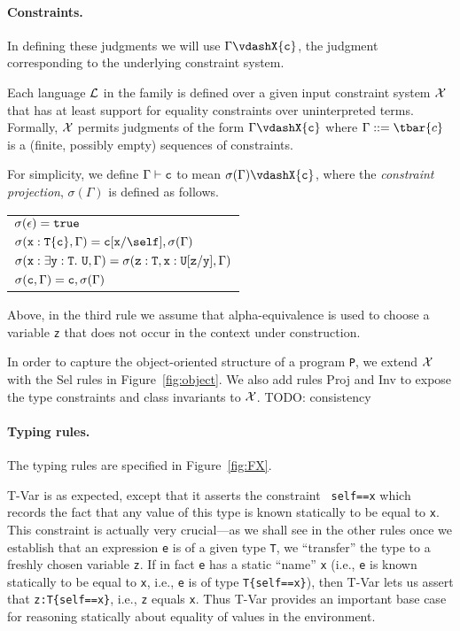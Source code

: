 \paragraph{Constraints.}
In defining these judgments we will use \mbox{$\Gamma \vdashX {\tt c}$},
the judgment corresponding to the underlying constraint system.

Each language $\cal L$ in the family is defined over a given input
constraint system $\cal X$ that has at least support for equality constraints over uninterpreted terms.
Formally, $\cal X$ permits judgments of the form
$\Gamma \vdashX {\tt c}$ where $\Gamma::=\tbar{c}$ is a (finite, possibly empty) sequences of constraints.

For
simplicity, we define $\Gamma \vdash {\tt c}$ to mean
$\sigma(\Gamma)\vdashX {\tt c}$, where the {\em constraint
projection}, $\sigma(\Gamma)$ is defined as follows. 
%
\begin{center}
\begin{tabular}{l}
$\sigma(\epsilon)={\tt true}$\\
$\sigma({\tt x}:{\tt T\{c\}}, \Gamma)={\tt c}[{\tt x}/\self], \sigma(\Gamma)$\\
$\sigma({\tt x}:\exists {\tt y}:{\tt T}.~{\tt U}, \Gamma)=\sigma({\tt z:T}, {\tt x}:{\tt U[{\tt z}/{\tt y}]},\Gamma)$\\
$\sigma({\tt c},\Gamma) = {\tt c}, \sigma(\Gamma)$
\end{tabular}
\end{center}
%
Above, in the third rule we assume that alpha-equivalence is used to
choose a variable {\tt z} that does not
occur in the context under construction.

In order to capture the object-oriented structure of a program {\tt P}, we extend $\cal X$ with the {\sc Sel} rules in Figure~\ref{fig:object}. We also add rules {\sc Proj} and {\sc Inv} to expose the type constraints and class invariants to $\cal X$. TODO: consistency

\paragraph{Typing rules.} The typing rules are specified in Figure~\ref{fig:FX}.

{\sc T-Var} is as expected, except that it asserts the constraint {\tt
self==x} which records the fact that any value of this type is known
statically to be equal to {\tt x}. This constraint is actually very
crucial---as we shall see in the other rules once we establish that
an expression {\tt e} is of a given type {\tt T}, we ``transfer'' the
type to a freshly chosen variable {\tt z}. If in fact {\tt e} has a
static ``name'' {\tt x} (i.e., {\tt e} is known statically to be
equal to {\tt x}, i.e., {\tt e} is of type {\tt T\{self==x\}}), then
{\sc T-Var} lets us assert that {\tt z:T\{self==x\}}, i.e., {\tt z}
equals {\tt x}. Thus {\sc T-Var} provides an important base case for
reasoning statically about equality of values in the environment.

